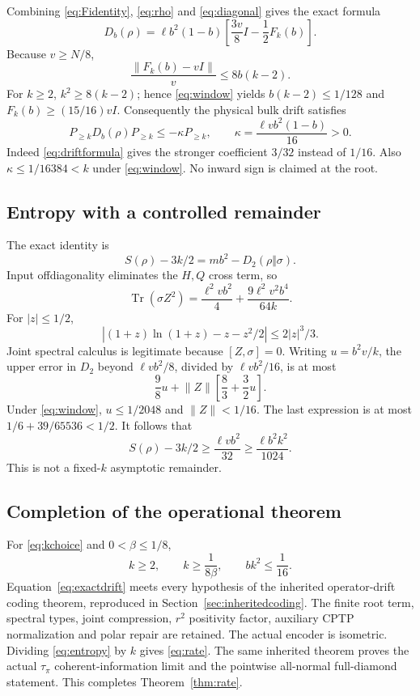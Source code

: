 \documentclass[11pt]{article}
\newcommand{\Tr}{\operatorname{Tr}}
\newcommand{\norm}[1]{\lVert #1\rVert}
\begin{document}
Combining \eqref{eq:Fidentity}, \eqref{eq:rho} and
\eqref{eq:diagonal} gives the exact formula
\begin{equation}\label{eq:driftformula}
 D_b(\rho)=\ell b^2(1-b)\left[\frac{3v}{8}I-\frac12F_k(b)\right].
\end{equation}
Because \(v\ge N/8\),
\[
 \frac{\norm{F_k(b)-vI}}v\le8b(k-2).
\]
For \(k\ge2\), \(k^2\ge8(k-2)\); hence \eqref{eq:window} yields
\(b(k-2)\le1/128\) and \(F_k(b)\ge(15/16)vI\).
Consequently the physical bulk drift satisfies
\begin{equation}\label{eq:exactdrift}
 P_{\ge k}D_b(\rho)P_{\ge k}
 \le-\kappa P_{\ge k},\qquad
 \kappa=\frac{\ell v b^2(1-b)}{16}>0.
\end{equation}
Indeed \eqref{eq:driftformula} gives the stronger coefficient \(3/32\)
instead of \(1/16\). Also \(\kappa\le1/16384<k\) under
\eqref{eq:window}. No inward sign is claimed at the root.

\subsection{Entropy with a controlled remainder}

The exact identity is
\[
 S(\rho)-3k/2=mb^2-D_2(\rho\Vert\sigma).
\]
Input offdiagonality eliminates the \(H,Q\) cross term, so
\[
 \Tr(\sigma Z^2)
 =\frac{\ell^2vb^2}{4}+\frac{9\ell^2v^2b^4}{64k}.
\]
For \(|z|\le1/2\),
\[
 |(1+z)\ln(1+z)-z-z^2/2|\le2|z|^3/3.
\]
Joint spectral calculus is legitimate because \([Z,\sigma]=0\).
Writing \(u=b^2v/k\), the upper error in \(D_2\) beyond
\(\ell vb^2/8\), divided by \(\ell vb^2/16\), is at most
\[
 \frac98u+\norm Z\left[\frac83+\frac32u\right].
\]
Under \eqref{eq:window}, \(u\le1/2048\) and \(\norm Z<1/16\).
The last expression is at most \(1/6+39/65536<1/2\).
It follows that
\begin{equation}\label{eq:entropy}
 S(\rho)-3k/2\ge\frac{\ell vb^2}{32}
              \ge\frac{\ell b^2k^2}{1024}.
\end{equation}
This is not a fixed-\(k\) asymptotic remainder.

\subsection{Completion of the operational theorem}

For \eqref{eq:kchoice} and \(0<\beta\le1/8\),
\[
 k\ge2,\qquad k\ge\frac1{8\beta},\qquad bk^2\le\frac1{16}.
\]
Equation~\eqref{eq:exactdrift} meets every hypothesis of the inherited
operator-drift coding theorem, reproduced in
Section~\ref{sec:inheritedcoding}. The finite root term, spectral types,
joint compression, \(r^2\) positivity factor, auxiliary CPTP normalization
and polar repair are retained. The actual encoder is isometric.
Dividing \eqref{eq:entropy} by \(k\) gives \eqref{eq:rate}.
The same inherited theorem proves the actual \(\tau_\pi\) coherent-information
limit and the pointwise all-normal full-diamond statement.
This completes Theorem~\ref{thm:rate}.
\end{document}
